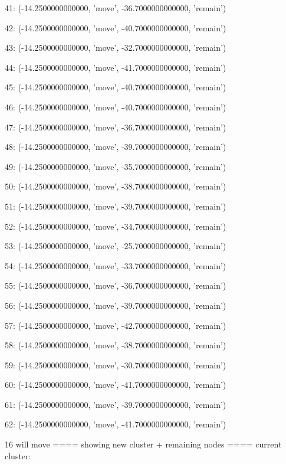 41: (-14.2500000000000, 'move', -36.7000000000000, 'remain')


42: (-14.2500000000000, 'move', -40.7000000000000, 'remain')


43: (-14.2500000000000, 'move', -32.7000000000000, 'remain')


44: (-14.2500000000000, 'move', -41.7000000000000, 'remain')


45: (-14.2500000000000, 'move', -40.7000000000000, 'remain')


46: (-14.2500000000000, 'move', -40.7000000000000, 'remain')


47: (-14.2500000000000, 'move', -36.7000000000000, 'remain')


48: (-14.2500000000000, 'move', -39.7000000000000, 'remain')


49: (-14.2500000000000, 'move', -35.7000000000000, 'remain')


50: (-14.2500000000000, 'move', -38.7000000000000, 'remain')


51: (-14.2500000000000, 'move', -39.7000000000000, 'remain')


52: (-14.2500000000000, 'move', -34.7000000000000, 'remain')


53: (-14.2500000000000, 'move', -25.7000000000000, 'remain')


54: (-14.2500000000000, 'move', -33.7000000000000, 'remain')


55: (-14.2500000000000, 'move', -36.7000000000000, 'remain')


56: (-14.2500000000000, 'move', -39.7000000000000, 'remain')


57: (-14.2500000000000, 'move', -42.7000000000000, 'remain')


58: (-14.2500000000000, 'move', -38.7000000000000, 'remain')


59: (-14.2500000000000, 'move', -30.7000000000000, 'remain')


60: (-14.2500000000000, 'move', -41.7000000000000, 'remain')


61: (-14.2500000000000, 'move', -39.7000000000000, 'remain')


62: (-14.2500000000000, 'move', -41.7000000000000, 'remain')


16 will move
==== showing new cluster + remaining nodes ====
current cluster:


